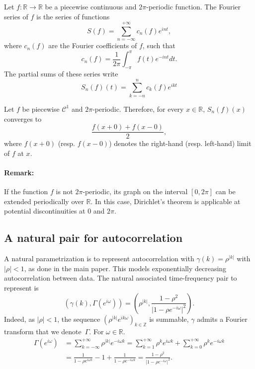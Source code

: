\begin{definition}
    Let $f: \mathbb{R}\rightarrow \mathbb{R}$ be a piecewise continuous and $2\pi$-periodic function. The Fourier series of $f$ is the series of functions 
    \[
    S(f) = \sum_{n=-\infty}^{+\infty}
c_n(f)e^{int},  
\]
where $c_n(f)$ are the Fourier coefficients of $f$, such that 
\[
c_n(f) = \frac{1}{2\pi}\int_{-\pi}^\pi f(t)e^{-int}dt.
\]
The partial sums of these series write
\[
S_n(f)(t) = \sum_{k=-n}^nc_k(f)e^{ikt}
\]
\end{definition}

\begin{theorem}[Dirichlet]
    Let $f$ be piecewise $\mathcal{C}^1$ and $2\pi$-periodic. Therefore, for every $x\in\mathbb{R}$, $S_n(f)(x)$ converges to 
    \[
    \frac{f(x+0) + f(x-0)}{2},
    \]
    where $f(x+0)$ (resp. $f(x-0)$) denotes the right-hand (resp. left-hand) limit of $f$ at $x$.
\end{theorem}

\paragraph{Remark:}If the function \( f \) is not \( 2\pi \)-periodic, its graph on the interval \([0, 2\pi]\) can be extended periodically over \(\mathbb{R}\). In this case, Dirichlet's theorem is applicable at potential discontinuities at \( 0 \) and \( 2\pi \).

\subsection{A natural pair for autocorrelation}\label{appendix subsection natural pair}

A natural parametrization is to represent autocorrelation with $\gamma(k) = \rho^{\vert k\vert}$ with $\vert\rho\vert < 1$, as done in the main paper. This models exponentially decreasing autocorrelation between data. The natural associated time-frequency pair to represent is 
\[
(\gamma(k), \Gamma(e^{i\omega})) = (\rho^{\vert k\vert}, \frac{1-\rho^2}{\vert 1-\rho e^{-i\omega}\vert^2})
.\]
Indeed, as $\vert\rho\vert<1$, the sequence \((\rho^{\vert k\vert}e^{ik\omega})_{k\in\mathbb{Z}}\) is summable, \(\gamma\) admits a Fourier transform that we denote~$\Gamma$. For $\omega\in\mathbb{R}$.
\begin{align*}
    \Gamma(e^{i\omega}) &= \sum_{k=-\infty}^{+\infty}\rho^{\vert k\vert}e^{-i\omega k} =\sum_{k=1}^{+\infty}\rho^k e^{i\omega k} + \sum_{k=0}^{+\infty}\rho^ke^{-i\omega k}\\
    &= \frac{1}{1-\rho e^{i\omega k}} -1 + \frac{1}{1-\rho e^{-i\omega k}} =\frac{1-\rho^2}{\vert 1-\rho e^{-i\omega}\vert^2}.
\end{align*}

